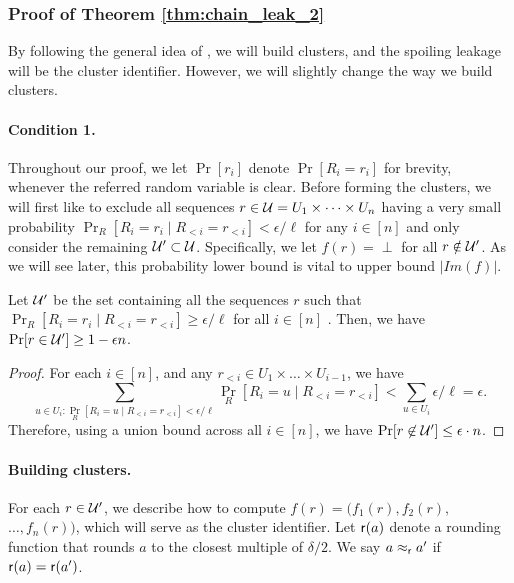 \subsubsection{Proof of Theorem \ref{thm:chain_leak_2}}
By following the general idea of \cite{skorski2019strong}, we will build clusters, and the spoiling leakage will be the cluster identifier. However, we will slightly change the way we build clusters.

\paragraph{Condition 1.}
Throughout our proof, we let $\Pr[r_i]$ denote $\Pr[R_i = r_i]$ for brevity, whenever the referred random variable is clear.
Before forming the clusters, we will first like to exclude all sequences $r \in \mathcal{U} = U_1 \times\dots\times U_n$ having a very small probability 
$\Pr_{R}[R_i = r_i \mid R_{<i} = r_{<i}] < \epsilon/\ell$ for any $i \in [n]$ and only consider the remaining $\mathcal{U}' \subset \mathcal{U}$. Specifically, we let $f(r) = \perp$ for all $r \notin \mathcal{U}'$.
As we will see later, this probability lower bound is vital to upper bound $|Im(f)|$. 

\begin{claim}
Let $\mathcal{U}'$ be the set containing all the sequences $r$ such that $\Pr_{R}[R_i = r_i \mid R_{<i} = r_{<i}] \geq \epsilon/\ell$ for all $i \in [n]$ . Then, we have $\Pr[ r \in \mathcal{U}' ] \ge 1 - \epsilon n$.  
\end{claim}  

\begin{proof}
For each $i \in [n]$, and any $r_{<i} \in U_1 \times\dots\times U_{i-1}$, we have 
\[ \sum_{u \in U_i: \Pr_{R}[R_i = u \mid R_{<i} = r_{<i}] < \epsilon/\ell} \Pr_{R}[R_i = u \mid R_{<i} = r_{<i}] < \sum_{u \in U_i} \epsilon/\ell =\epsilon. \]
Therefore, using a union bound across all $i\in [n]$, we have
$\Pr[r \not \in \mathcal{U}'] \leq \epsilon \cdot n$. \qedhere  
\end{proof}
%

\paragraph{Building clusters.} 
For each $r \in \mathcal{U}'$, we describe how to compute $f(r) = (f_1(r), f_2(r),$ $\ldots, f_n(r))$, which will serve as the cluster identifier. 
%
 Let $\mathsf{r}(a)$ denote a rounding function that rounds $a$ to the closest multiple of $\delta/2$. We say $a \approx_{\mathsf{r}} a'$ if $\mathsf{r}(a) = \mathsf{r}(a')$. 

